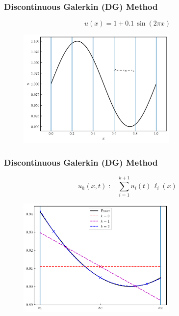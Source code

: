 \documentclass{beamer}
\begin{document}
\begin{frame}
\frametitle{Discontinuous Galerkin (DG) Method}

  \Fontvi

  \begin{equation*}
    u\left(x\right)=1+0.1\,\sin\left(2\pi x\right)
  \end{equation*}

  \begin{figure}[htb!]
    \centering
    \includegraphics[width=0.7\textwidth]{fig.sine.png}
  \end{figure}

\end{frame}

\begin{frame}
\frametitle{Discontinuous Galerkin (DG) Method}

  \Fontvi

  \begin{equation*}
    u_{h}\left(x,t\right)
    :=\sum\limits_{i=1}^{k+1}
      u_{i}\left(t\right)\,\ell_{i}\left(x\right)
  \end{equation*}

  \begin{figure}[htb!]
    \centering
    \includegraphics[width=0.7\textwidth]{fig.DG_1D.png}
  \end{figure}

\end{frame}
\end{document}
